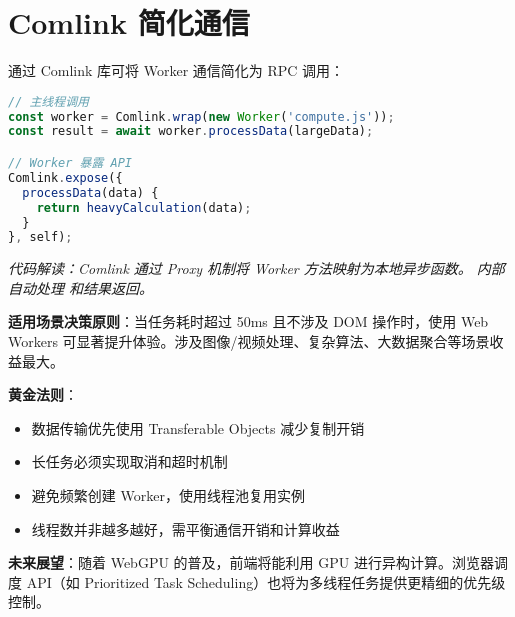\section{Comlink 简化通信}
通过 Comlink 库可将 Worker 通信简化为 RPC 调用：\par
\begin{lstlisting}[language=javascript]
// 主线程调用
const worker = Comlink.wrap(new Worker('compute.js'));
const result = await worker.processData(largeData); 

// Worker 暴露 API
Comlink.expose({
  processData(data) {
    return heavyCalculation(data);
  }
}, self);
\end{lstlisting}
\textit{代码解读：Comlink 通过 Proxy 机制将 Worker 方法映射为本地异步函数。 内部自动处理  和结果返回。}\par
\textbf{适用场景决策原则}：当任务耗时超过 50ms 且不涉及 DOM 操作时，使用 Web Workers 可显著提升体验。涉及图像/视频处理、复杂算法、大数据聚合等场景收益最大。\par
\textbf{黄金法则}：\par
\begin{itemize}
\item 数据传输优先使用 Transferable Objects 减少复制开销
\item 长任务必须实现取消和超时机制
\item 避免频繁创建 Worker，使用线程池复用实例
\item 线程数并非越多越好，需平衡通信开销和计算收益
\end{itemize}
\textbf{未来展望}：随着 WebGPU 的普及，前端将能利用 GPU 进行异构计算。浏览器调度 API（如 Prioritized Task Scheduling）也将为多线程任务提供更精细的优先级控制。\par
